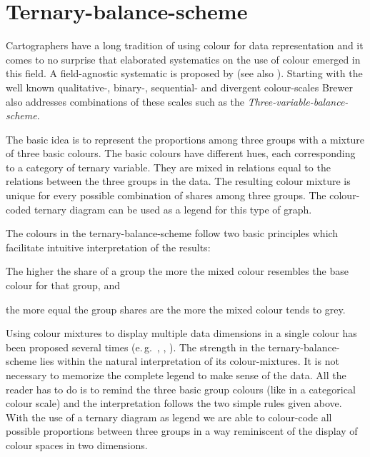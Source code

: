 \documentclass[a4paper]{scrartcl}
\begin{document}
\section*{Ternary-balance-scheme}

Cartographers have a long tradition of using colour for data representation and it comes to no surprise that elaborated systematics on the use of colour emerged in this field. A field-agnostic systematic is proposed by \textcite{Brewer1994a} (see also \cite{Brewer1994}). Starting with the well known qualitative-, binary-, sequential- and divergent colour-scales Brewer also addresses combinations of these scales such as the \emph{Three-variable-balance-scheme}.

The basic idea is to represent the proportions among three groups with a mixture of three basic colours. The basic colours have different hues, each corresponding to a category of ternary variable. They are mixed in relations equal to the relations between the three groups in the data. The resulting colour mixture is unique for every possible combination of shares among three groups. The colour-coded ternary diagram can be used as a legend for this type of graph.

The colours in the ternary-balance-scheme follow two basic principles which facilitate intuitive interpretation of the results:

\begin{compactenum}
  \item The higher the share of a group the more the mixed colour resembles the base colour for that group, and
  \item the more equal the group shares are the more the mixed colour tends to grey.
\end{compactenum}

Using colour mixtures to display multiple data dimensions in a single colour has been proposed several times (e.\,g.~\cite{Trumbo1981}, \cite{Eyton1984}, \cite{Ware1988}). The strength in the ternary-balance-scheme lies within the natural interpretation of its colour-mixtures. It is not necessary to memorize the complete legend to make sense of the data. All the reader has to do is to remind the three basic group colours (like in a categorical colour scale) and the interpretation follows the two simple rules given above. With the use of a ternary diagram as legend we are able to colour-code all possible proportions between three groups in a way reminiscent of the display of colour spaces in two dimensions.
\end{document}
